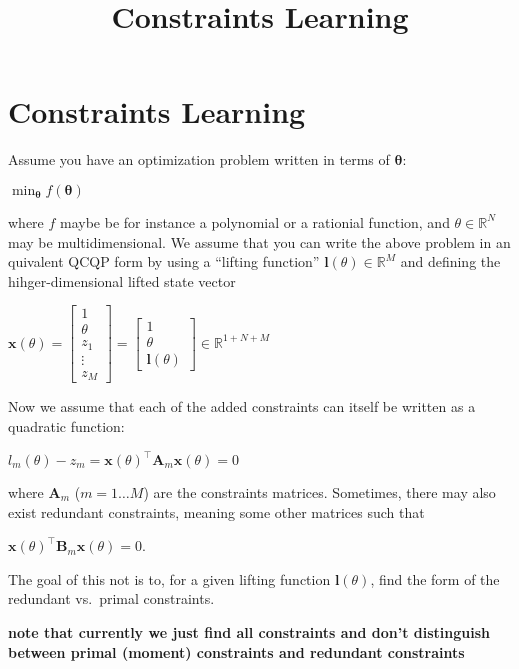 \documentclass[11pt]{article}
\title{Constraints Learning}
\begin{document}
  
\maketitle
  
\section{Constraints Learning}\label{constraints-learning}

Assume you have an optimization problem written in terms of
\(\mathbf{\theta}\):

\(\min_{\mathbf{\theta}} f(\mathbf{\theta})\)

where \(f\) maybe be for instance a polynomial or a rationial function,
and \(\theta \in \mathbb{R}^N\) may be multidimensional. We assume that
you can write the above problem in an quivalent QCQP form by using a
``lifting function'' \(\mathbf{l}(\theta) \in \mathbb{R}^M\) and
defining the hihger-dimensional lifted state vector

\(\mathbf{x}(\theta) = \begin{bmatrix}1 \\ \theta \\ z_1 \\ \vdots \\ z_M \end{bmatrix} = \begin{bmatrix}1 \\ \theta \\ \mathbf{l}(\theta) \end{bmatrix} \in \mathbb{R}^{1+N+M}\)

Now we assume that each of the added constraints can itself be written
as a quadratic function:

\(l_m(\theta) - z_m = \mathbf{x}(\theta)^\top \mathbf{A}_m \mathbf{x}(\theta) = 0\)

where \(\mathbf{A}_m\) (\(m=1\ldots M\)) are the constraints matrices.
Sometimes, there may also exist redundant constraints, meaning some
other matrices such that

\(\mathbf{x}(\theta)^\top \mathbf{B}_m \mathbf{x}(\theta) = 0\).

The goal of this not is to, for a given lifting function
\(\mathbf{l}(\theta)\), find the form of the redundant vs.~primal
constraints.

\textbf{note that currently we just find all constraints and don't
distinguish between primal (moment) constraints and redundant
constraints}
\end{document}
